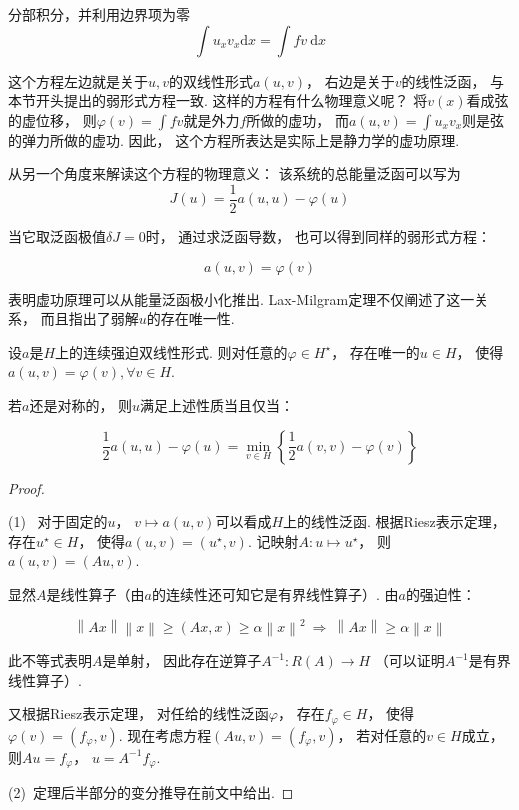 分部积分，并利用边界项为零
\[
\int u_x v_x \mathrm{d}x
= \int f v ~\mathrm{d}x
\]

这个方程左边就是关于$u,v$的双线性形式$a(u,v)$，
右边是关于$v$的线性泛函，
与本节开头提出的弱形式方程一致.
这样的方程有什么物理意义呢？
将$v(x)$看成弦的虚位移，
则$\varphi(v) = \int fv$就是外力$f$所做的虚功，
而$a(u,v) = \int u_x v_x $则是弦的弹力所做的虚功.
因此，
这个方程所表达是实际上是静力学的虚功原理.

从另一个角度来解读这个方程的物理意义：
该系统的总能量泛函可以写为
\[
J(u) = \frac{1}{2} a(u,u) - \varphi(u)
\]

当它取泛函极值$\delta J = 0$时，
通过求泛函导数，
也可以得到同样的弱形式方程：

\[
a(u,v) = \varphi (v) 
\]

表明虚功原理可以从能量泛函极小化推出.
Lax-Milgram定理不仅阐述了这一关系，
而且指出了弱解$u$的存在唯一性.

\begin{theorem}
    设$a$是$H$上的连续强迫双线性形式.
    则对任意的$\varphi \in H^\star$，
    存在唯一的$u \in H$，
    使得$a(u , v) = \varphi (v), \forall v \in H$.

    若$a$还是对称的，
    则$u$满足上述性质当且仅当：

    \[
    \frac{1}{2} a(u,u) - \varphi(u) = \min_{v \in H} \left\{ \frac{1}{2} a(v,v) - \varphi (v) \right\}
    \]
\end{theorem}


\begin{proof}~

    (1)~
    对于固定的$u$，
    $v \mapsto a(u,v)$可以看成$H$上的线性泛函.
    根据Riesz表示定理，
    存在$u^\star \in H$，
    使得$a(u,v) = (u^\star , v)$.
    记映射$A: u \mapsto u^\star$，
    则$a(u,v) = (Au , v)$.

    显然$A$是线性算子（由$a$的连续性还可知它是有界线性算子）.
    由$a$的强迫性：

    \[
    \left\| Ax \right\| \left\| x \right\| \ge  (Ax, x)
    \ge \alpha \left\| x \right\|^2
    ~ \Rightarrow ~
    \left\| Ax \right\| \ge \alpha \left\| x \right\|
    \]

    此不等式表明$A$是单射，
    因此存在逆算子$A^{-1} : R(A) \to H$
    （可以证明$A^{-1}$是有界线性算子）.

    又根据Riesz表示定理，
    对任给的线性泛函$\varphi$，
    存在$f_{\varphi} \in H$，
    使得$\varphi (v) = (f_{\varphi} , v)$.
    现在考虑方程$(Au,v) = (f_{\varphi} , v)$，
    若对任意的$v \in H$成立，
    则$Au = f_{\varphi}$，
    $u = A^{-1} f_{\varphi}$.

    \smallskip

    (2)~定理后半部分的变分推导在前文中给出.
\end{proof}

